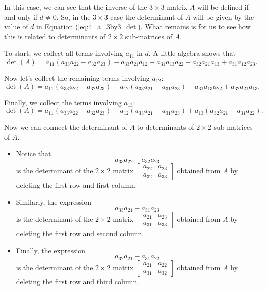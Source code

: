 In this case, we can see that the inverse of the $3 \times 3$ matrix $A$ will be defined if and only if $d \neq 0$. So, in the $3 \times 3$ case the determinant of $A$ will be given by the value of $d$ in Equation (\ref{eq:4_a_3by3_det}). What remains is for us to see how this is related to determinants of $2 \times 2$ sub-matrices of $A$. 

To start, we collect all terms involving $a_{11}$ in $d$. A little algebra shows that
\[\det(A) = a_{11} \left( a_{33} a_{22} - a_{32} a_{23} \right) - a_{33} a_{21} a_{12} - a_{31} a_{13} a_{22} + a_{32}a_{21}a_{13} + a_{31} a_{12} a_{23}.\]

Now let's collect the remaining terms involving $a_{12}$:
\[\det(A) = a_{11} \left( a_{33} a_{22} - a_{32} a_{23} \right) - a_{12} \left(a_{33} a_{21} - a_{31} a_{23} \right)  - a_{31} a_{13} a_{22} + a_{32}a_{21}a_{13}.\]

Finally, we collect the terms involving $a_{13}$:
\[\det(A) = a_{11} \left( a_{33} a_{22} - a_{32} a_{23} \right) - a_{12} \left(a_{33} a_{21} - a_{31} a_{23} \right) + a_{13} \left(a_{32} a_{21} - a_{31} a_{22} \right).\]

Now we can connect the determinant of $A$ to determinants of $2 \times 2$ sub-matrices of $A$. 
\begin{itemize}
\item Notice that 
\[a_{33} a_{22} - a_{32} a_{23}\]
is the determinant of the $2 \times 2$ matrix $\left[ \begin{array}{cc} a_{22}&a_{23} \\ a_{32}&a_{33} \end{array} \right]$ obtained from $A$ by deleting the first row and first column.
\item Similarly, the expression
\[a_{33} a_{21} - a_{31} a_{23}\]
is the determinant of the $2 \times 2$ matrix $\left[ \begin{array}{cc} a_{21}&a_{23} \\ a_{31}&a_{33} \end{array} \right]$ obtained from $A$ by deleting the first row and second column.
\item Finally, the expression
\[a_{32} a_{21} - a_{31} a_{22}\]
is the determinant of the $2 \times 2$ matrix $\left[ \begin{array}{cc} a_{21}&a_{22} \\ a_{31}&a_{32} \end{array} \right]$ obtained from $A$ by deleting the first row and third column.
\end{itemize}

